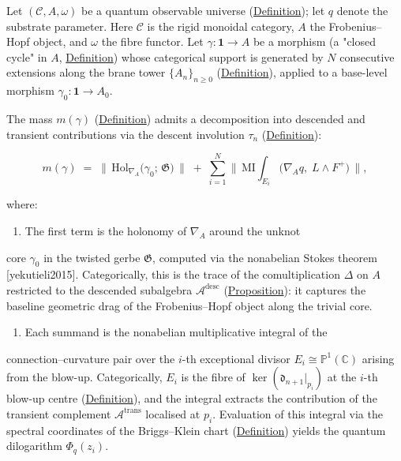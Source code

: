 \begin{theorem}
  \label{thm:topological-mass}
Let $(\mathcal{C}, A, \omega)$ be a quantum observable universe
(\hyperref[def:quantum-observable-universe]{Definition}); let $q$ denote the substrate parameter.  Here $\mathcal{C}$
is the rigid monoidal category, $A$ the Frobenius--Hopf object, and
$\omega$ the fibre functor.  Let
$\gamma \colon \mathbf{1} \to A$ be a morphism (a "closed cycle" in $A$,
\hyperref[def:mass-identity]{Definition}) whose categorical support is
generated by $N$ consecutive extensions along the brane tower
$\{A_n\}_{n \geq 0}$
(\hyperref[def:recursive-brane-tower]{Definition}), applied to a base-level
morphism $\gamma_0 \colon \mathbf{1} \to A_0$.

The mass $m(\gamma)$ (\hyperref[def:mass-identity]{Definition}) admits a
decomposition into descended and transient contributions via the
descent involution $\tau_n$
(\hyperref[def:descent-involution]{Definition}):

\begin{equation}\label{eq:topological-mass-decomp}
  m(\gamma)
  \;=\;
  \bigl\lVert\,
  \mathrm{Hol}_{\nabla_A}\!\bigl(\gamma_0;\, \mathfrak{G}\bigr)
  \,\bigr\rVert
  \;+\;
  \sum_{i=1}^{N}
  \bigl\lVert\,
  \mathrm{MI}\!\!\int_{E_i}
  \bigl(\nabla_A q,\; L \wedge F^+\bigr)
  \,\bigr\rVert,
\end{equation}

where:

\begin{enumerate}
  \item The first term is the holonomy of $\nabla_A$ around the unknot
\end{enumerate}
   core $\gamma_0$ in the twisted gerbe $\mathfrak{G}$, computed via the
   nonabelian Stokes theorem [yekutieli2015].  Categorically,
   this is the trace of the comultiplication $\Delta$ on $A$
   restricted to the descended subalgebra
   $\mathcal{A}^{\mathrm{desc}}$
   (\hyperref[prop:descent-eigenspaces]{Proposition}): it captures the
   baseline geometric drag of the Frobenius--Hopf object along the
   trivial core.
\begin{enumerate}
  \item Each summand is the nonabelian multiplicative integral of the
\end{enumerate}
   connection--curvature pair over the $i$-th exceptional divisor
   $E_i \cong \mathbb{P}^1(\mathbb{C})$ arising from the blow-up.
   Categorically, $E_i$ is the fibre of
   $\ker(\mathfrak{d}_{n+1}|_{p_i})$ at the $i$-th blow-up centre
   (\hyperref[def:brane-boundary]{Definition}), and the integral extracts
   the contribution of the transient complement
   $\mathcal{A}^{\mathrm{trans}}$ localised at $p_i$.  Evaluation
   of this integral via the spectral coordinates of the Briggs--Klein
   chart (\hyperref[def:briggs-klein-chart]{Definition}) yields the
   quantum dilogarithm $\Phi_q(z_i)$.


\end{theorem}
